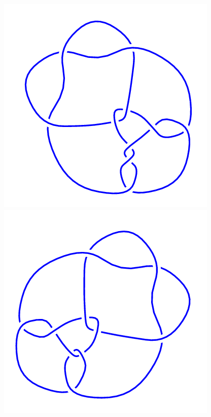 \begin{figure}[H]
\begin{minipage}[b]{.18\linewidth}
	\end{minipage}
	\begin{minipage}[b]{.18\linewidth}
		\centering
		\includegraphics[width=\linewidth]{../data/10_79.png}
	\end{minipage}
	\begin{minipage}[b]{.18\linewidth}
		\centering
		\includegraphics[width=\linewidth]{../data/10_80.png}

\end{minipage}
\end{figure}
